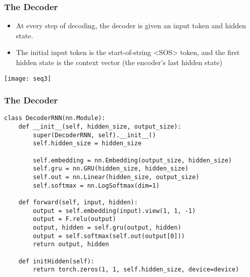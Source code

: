 \begin{frame}[fragile]
\frametitle{The Decoder}

\begin{itemize}
\item At every step of decoding, the decoder is given an input token and hidden state. 
\item The initial input token is the start-of-string <SOS> token, and the first hidden state is the context vector (the encoder's last hidden state)
\end{itemize}
\begin{center}
\texttt{[image: seq3]}
\end{center}           
\end{frame} 

\begin{frame}[fragile]
\frametitle{The Decoder}
\begin{lstlisting}    
class DecoderRNN(nn.Module):
    def __init__(self, hidden_size, output_size):
        super(DecoderRNN, self).__init__()
        self.hidden_size = hidden_size

        self.embedding = nn.Embedding(output_size, hidden_size)
        self.gru = nn.GRU(hidden_size, hidden_size)
        self.out = nn.Linear(hidden_size, output_size)
        self.softmax = nn.LogSoftmax(dim=1)

    def forward(self, input, hidden):
        output = self.embedding(input).view(1, 1, -1)
        output = F.relu(output)
        output, hidden = self.gru(output, hidden)
        output = self.softmax(self.out(output[0]))
        return output, hidden

    def initHidden(self):
        return torch.zeros(1, 1, self.hidden_size, device=device)
 
\end{lstlisting} 
      
\end{frame} 


